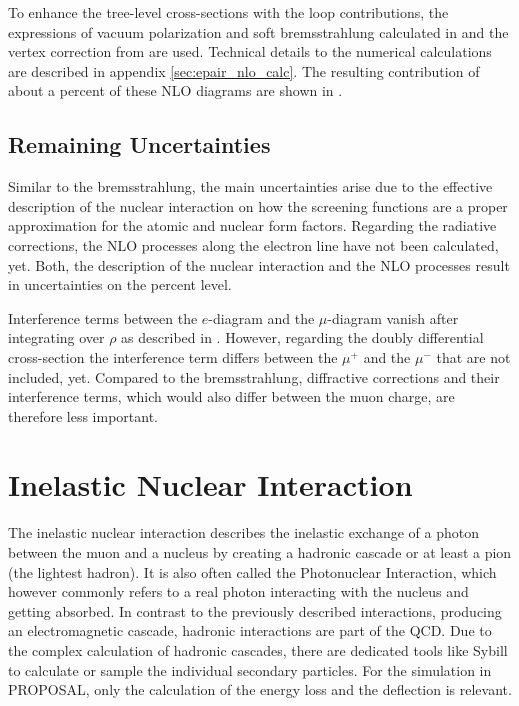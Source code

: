 To enhance the tree-level cross-sections with the loop contributions, the expressions of vacuum polarization and soft bremsstrahlung calculated in \cite{Mork65} and the vertex correction from \cite{Akhiezer81} are used.
Technical details to the numerical calculations are described in appendix \ref{sec:epair_nlo_calc}.
The resulting contribution of about a percent of these NLO diagrams are shown in .

\subsection{Remaining Uncertainties}

Similar to the bremsstrahlung, the main uncertainties arise due to the effective description of the nuclear interaction on how the screening functions are a proper approximation for the atomic and nuclear form factors.
Regarding the radiative corrections, the NLO processes along the electron line have not been calculated, yet.
Both, the description of the nuclear interaction and the NLO processes result in uncertainties on the percent level. \cite{Sandrock20ICPPA}

Interference terms between the $e$-diagram and the $\mu$-diagram vanish after integrating over $\rho$ as described in \cite{Kelner67}.
However, regarding the doubly differential cross-section the interference term differs between the $\mu^+$ and the $\mu^-$ that are not included, yet.
Compared to the bremsstrahlung, diffractive corrections and their interference terms, which would also differ between the muon charge, are therefore less important.

%
% 
%
%

\section{Inelastic Nuclear Interaction} \label{sec:photonucl}

The inelastic nuclear interaction describes the inelastic exchange of a photon between the muon and a nucleus by creating a hadronic cascade or at least a pion (the lightest hadron).
It is also often called the Photonuclear Interaction, which however commonly refers to a real photon interacting with the nucleus and getting absorbed.
In contrast to the previously described interactions, producing an electromagnetic cascade, hadronic interactions are part of the QCD.
Due to the complex calculation of hadronic cascades, there are dedicated tools like Sybill \cite{Sybill} to calculate or sample the individual secondary particles.
For the simulation in PROPOSAL, only the calculation of the energy loss and the deflection is relevant.

